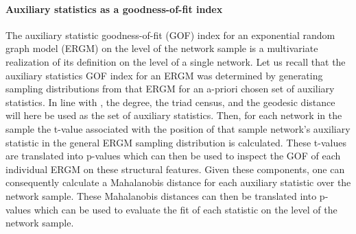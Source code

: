 \documentclass[a4paper, man]{apa6}
\begin{document}
\paragraph{Auxiliary statistics as a goodness-of-fit index} The auxiliary statistic goodness-of-fit (GOF) index for an exponential random graph model (ERGM) on the level of the network sample is a multivariate realization of its definition on the level of a single network. Let us recall that the auxiliary statistics GOF index for an ERGM was determined by generating sampling distributions from that ERGM for an a-priori chosen set of auxiliary statistics. In line with , the degree, the triad census, and the geodesic distance will here be used as the set of auxiliary statistics. Then, for each network in the sample the t-value associated with the position of that sample network's auxiliary statistic in the general ERGM sampling distribution is calculated. These t-values are translated into p-values which can then be used to inspect the GOF of each individual ERGM on these structural features. Given these components, one can consequently calculate a Mahalanobis distance for each auxiliary statistic over the network sample. These Mahalanobis distances can then be translated into p-values which can be used to evaluate the fit of each statistic on the level of the network sample. 
\\
\end{document}
